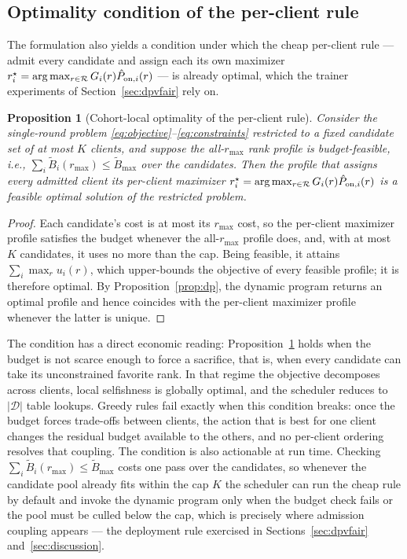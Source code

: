 \documentclass[a4paper,fleqn]{cas-dc}
\newtheorem{proposition}{Proposition}
\begin{document}
\subsection{Optimality condition of the per-client rule}
The formulation also yields a condition under which the cheap per-client rule --- admit every candidate and assign each its own maximizer $r_i^\star=\arg\max_{r\in\mathcal R}G_i(r)\hat P_{{\rm on},i}(r)$ --- is already optimal, which the trainer experiments of Section~\ref{sec:dpvfair} rely on.
\begin{proposition}[Cohort-local optimality of the per-client rule]
\label{prop:cohort}
Consider the single-round problem \eqref{eq:objective}--\eqref{eq:constraints} restricted to a fixed candidate set of at most $K$ clients, and suppose the all-$r_{\max}$ rank profile is budget-feasible, i.e., $\sum_i \widetilde B_i(r_{\max})\le\widetilde B_{\max}$ over the candidates. Then the profile that assigns every admitted client its per-client maximizer $r_i^\star=\arg\max_{r\in\mathcal R}G_i(r)\hat P_{{\rm on},i}(r)$ is a feasible optimal solution of the restricted problem.
\end{proposition}
\begin{proof}
Each candidate's cost is at most its $r_{\max}$ cost, so the per-client maximizer profile satisfies the budget whenever the all-$r_{\max}$ profile does, and, with at most $K$ candidates, it uses no more than the cap. Being feasible, it attains $\sum_i\max_r u_i(r)$, which upper-bounds the objective of every feasible profile; it is therefore optimal. By Proposition~\ref{prop:dp}, the dynamic program returns an optimal profile and hence coincides with the per-client maximizer profile whenever the latter is unique.
\end{proof}

The condition has a direct economic reading: Proposition~\ref{prop:cohort} holds when the budget is not scarce enough to force a sacrifice, that is, when every candidate can take its unconstrained favorite rank. In that regime the objective decomposes across clients, local selfishness is globally optimal, and the scheduler reduces to $|\mathcal D|$ table lookups. Greedy rules fail exactly when this condition breaks: once the budget forces trade-offs between clients, the action that is best for one client changes the residual budget available to the others, and no per-client ordering resolves that coupling. The condition is also actionable at run time. Checking $\sum_i \widetilde B_i(r_{\max})\le\widetilde B_{\max}$ costs one pass over the candidates, so whenever the candidate pool already fits within the cap $K$ the scheduler can run the cheap rule by default and invoke the dynamic program only when the budget check fails or the pool must be culled below the cap, which is precisely where admission coupling appears --- the deployment rule exercised in Sections~\ref{sec:dpvfair} and~\ref{sec:discussion}.
\end{document}
